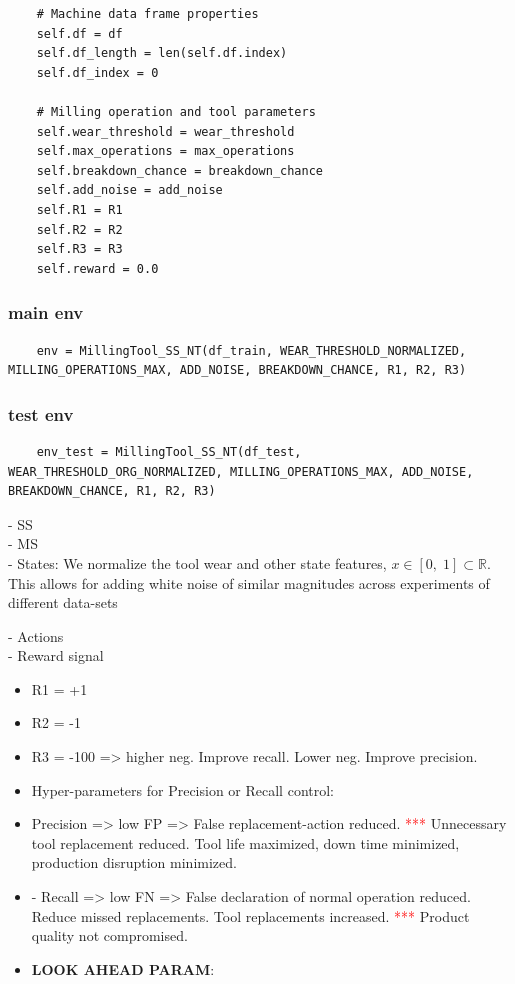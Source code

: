 \documentclass[a4paper, 12pt]{article}
\begin{document}
\begin{verbatim}
	# Machine data frame properties
	self.df = df
	self.df_length = len(self.df.index)
	self.df_index = 0
	
	# Milling operation and tool parameters
	self.wear_threshold = wear_threshold
	self.max_operations = max_operations
	self.breakdown_chance = breakdown_chance
	self.add_noise = add_noise
	self.R1 = R1
	self.R2 = R2
	self.R3 = R3
	self.reward = 0.0
\end{verbatim}

\subsubsection{main env}
\begin{verbatim}
	env = MillingTool_SS_NT(df_train, WEAR_THRESHOLD_NORMALIZED, MILLING_OPERATIONS_MAX, ADD_NOISE, BREAKDOWN_CHANCE, R1, R2, R3)
\end{verbatim}

\subsubsection{test env}
\begin{verbatim}
	env_test = MillingTool_SS_NT(df_test, WEAR_THRESHOLD_ORG_NORMALIZED, MILLING_OPERATIONS_MAX, ADD_NOISE, BREAKDOWN_CHANCE, R1, R2, R3)
\end{verbatim}



- SS\\
- MS\\
- States: We normalize the tool wear and other state features, $x \in [0,\;1] \subset \mathbb{R} $. This allows for adding white noise of similar magnitudes across experiments of different data-sets

- Actions\\
- Reward signal\\
\begin{itemize}
	\item R1 = +1 
	\item R2 = -1
	\item R3 = -100 => higher neg. Improve recall. Lower neg. Improve precision. 
	\item Hyper-parameters for Precision or Recall control: 
	\item Precision => low FP => False replacement-action reduced. \textcolor{red}{***} Unnecessary tool replacement reduced. Tool life maximized, down time minimized, production disruption minimized. 
	\item - Recall => low FN => False declaration of normal operation reduced. Reduce missed replacements. Tool replacements increased. \textcolor{red}{***} Product quality not compromised. 
	\item \textbf{LOOK AHEAD PARAM}: 
\end{itemize}
\end{document}

